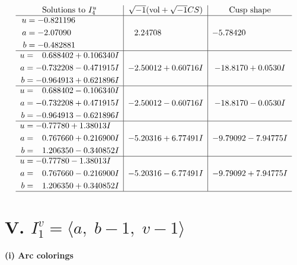 \documentclass[1p]{elsarticle_modified}
\theoremstyle{definition}
\newcommand{\I}{\sqrt{-1}}
\begin{document}
$$\begin{array}{c|c|c}  
\text{Solutions to }I^u_{4}& \I (\text{vol} + \sqrt{-1}CS) & \text{Cusp shape}\\
 \hline 
\begin{aligned}
u &= -0.821196\phantom{ +0.000000I} \\
a &= -2.07090\phantom{ +0.000000I} \\
b &= -0.482881\phantom{ +0.000000I}\end{aligned}
 & \phantom{-}2.24708\phantom{ +0.000000I} & -5.78420\phantom{ +0.000000I} \\ \hline\begin{aligned}
u &= \phantom{-}0.688402 + 0.106340 I \\
a &= -0.732208 - 0.471915 I \\
b &= -0.964913 + 0.621896 I\end{aligned}
 & -2.50012 + 0.60716 I & -18.8170 + 0.0530 I \\ \hline\begin{aligned}
u &= \phantom{-}0.688402 - 0.106340 I \\
a &= -0.732208 + 0.471915 I \\
b &= -0.964913 - 0.621896 I\end{aligned}
 & -2.50012 - 0.60716 I & -18.8170 - 0.0530 I \\ \hline\begin{aligned}
u &= -0.77780 + 1.38013 I \\
a &= \phantom{-}0.767660 + 0.216900 I \\
b &= \phantom{-}1.206350 - 0.340852 I\end{aligned}
 & -5.20316 + 6.77491 I & -9.79092 - 7.94775 I \\ \hline\begin{aligned}
u &= -0.77780 - 1.38013 I \\
a &= \phantom{-}0.767660 - 0.216900 I \\
b &= \phantom{-}1.206350 + 0.340852 I\end{aligned}
 & -5.20316 - 6.77491 I & -9.79092 + 7.94775 I\\
 \hline 
 \end{array}$$\newpage\newpage\renewcommand{\arraystretch}{1}
\centering \section*{V. $I^v_{1}= \langle a,\;b-1,\;v-1 \rangle$}
\flushleft \textbf{(i) Arc colorings}\\
\end{document}
